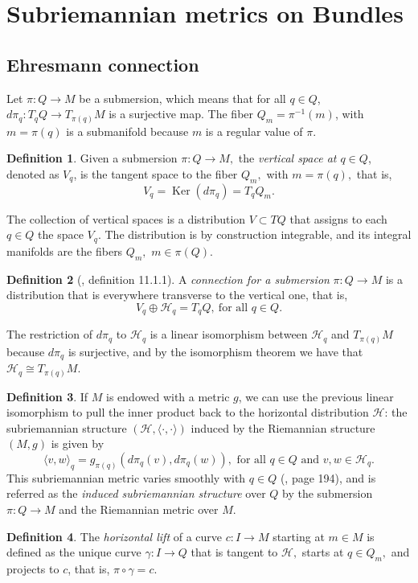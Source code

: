 \documentclass[12pt, letterpaper, reqno]{amsart}
\theoremstyle{definition}
\newtheorem{df}{Definition}
\theoremstyle{plain}
\theoremstyle{remark}
\begin{document}
\section{Subriemannian metrics on Bundles}%
\label{sec:metrics_on_bundles}
\subsection{Ehresmann connection}%
\label{sub:ehresmann_connection}


Let $ \pi : Q \rightarrow {M} $ be a submersion, which means that for all $ q\in Q $, $ d\pi_q : T_q Q \rightarrow {T_{\pi(q)}}M $ is a surjective map. The fiber $ Q_m = \pi^{-1}(m) $, with $ m=\pi(q) $ is a submanifold because $ m $ is a regular value of $ \pi. $  

\begin{df}
	Given a submersion $ \pi:Q \rightarrow {M}, $ the \textit{vertical space at $ q\in Q $}, denoted as $ V_q $, is the tangent space to the fiber $ Q_m, $ with $ m=\pi(q), $ that is,  
	$$ V_q = \operatorname{Ker}(d\pi_q) = T_q Q_m.  $$ 
\end{df}

The collection of vertical spaces is a distribution $ V \subset TQ $ that assigns to each $ q\in Q $ the space $ V_q. $ The distribution is by construction integrable, and its integral manifolds are the fibers $ Q_m, $ $ m\in \pi(Q). $ 

\begin{df}[\cite{montgomery2002tour}, definition 11.1.1]
	A \textit{connection for a submersion} $ \pi:Q \rightarrow {M} $ is a distribution that is everywhere transverse to the vertical one, that is,  
	$$ V_q \oplus \mathcal{H}_q = T_q Q,\ \text{for all } q\in Q. $$ 
\end{df}

The restriction of $ d\pi_q $ to $ \mathcal{H}_q $ is a linear isomorphism between $ \mathcal{H}_q $ and $ T_{\pi(q)} M $  because $ d\pi_q $ is surjective, and by the isomorphism theorem we have that $ \mathcal{H}_q\cong T_{\pi(q)} M $. 

\begin{df}\label{df:ind_sub_struc}
If $ M $ is endowed with a metric $ g $, we can use the previous linear isomorphism to pull the inner product back to the horizontal distribution $ \mathcal{H}$: the subriemannian structure $ (\mathcal{H},\langle \cdot, \cdot\rangle) $ induced by the Riemannian structure $ (M,g) $ is given by
$$ \langle v,w \rangle_q = g_{\pi(q)} \left( d\pi_q(v), d\pi_q(w) \right), \text{ for all }q\in Q \text{ and } v,w\in \mathcal{H}_q.   $$ 
This subriemannian metric varies smoothly with $ q\in Q $ (\cite{montgomery2002tour}, page 194), and is referred as the \textit{induced subriemannian structure} over $ Q $ by the submersion $ \pi: Q \rightarrow M $ and the Riemannian metric over $ M. $ 
\end{df}
\begin{df}
	The \textit{horizontal lift} of a curve $ c: I \rightarrow {M} $ starting at $ m\in M $ is defined as the unique curve $ \gamma : I \rightarrow {Q} $ that is tangent to $ \mathcal{H}, $ starts at $ q\in Q_m, $ and projects to $c$, that is, $ \pi\circ\gamma = c. $ 
\end{df}
\end{document}
